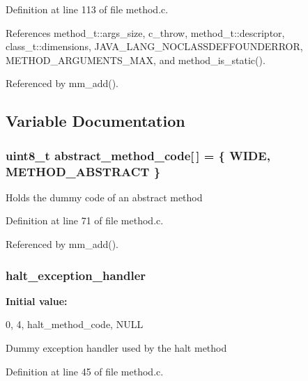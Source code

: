 Definition at line 113 of file method.c.



References method\_\-t::args\_\-size, c\_\-throw, method\_\-t::descriptor, class\_\-t::dimensions, JAVA\_\-LANG\_\-NOCLASSDEFFOUNDERROR, METHOD\_\-ARGUMENTS\_\-MAX, and method\_\-is\_\-static().



Referenced by mm\_\-add().



\subsection{Variable Documentation}
\subsubsection[{abstract\_\-method\_\-code}]{\setlength{\rightskip}{0pt plus 5cm}uint8\_\-t {\bf abstract\_\-method\_\-code}[$\,$] = \{ WIDE, METHOD\_\-ABSTRACT \}\hspace{0.3cm}{\ttfamily  [static]}}\label{method_8c_a5fd2bf516a132004bfca83a0f3ecc83c}
Holds the dummy code of an abstract method 

Definition at line 71 of file method.c.



Referenced by mm\_\-add().

\subsubsection[{halt\_\-exception\_\-handler}]{ {\bf halt\_\-exception\_\-handler}}\label{method_8c_af5347a7347add59dc72308e16762cf85}
{\bfseries Initial value:}
\begin{DoxyCode}
 {
    0, 
    4, 
    halt_method_code, 
    NULL 
}
\end{DoxyCode}
Dummy exception handler used by the halt method 

Definition at line 45 of file method.c.

